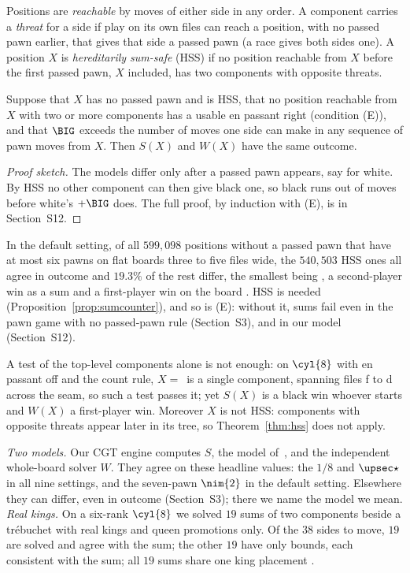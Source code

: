 \begin{definition}\label{def:hss}
Positions are \emph{reachable} by moves of either side in any order. A component carries a \emph{threat} for a
side if play on its own files can reach a position, with no passed pawn earlier, that gives that side a passed pawn (a race gives both sides one). A position $X$ is \emph{hereditarily
sum-safe} (HSS) if no position reachable from $X$ before the first passed pawn, $X$ included, has two components with opposite threats.
\end{definition}

\begin{theorem}\label{thm:hss}
Suppose that $X$ has no passed pawn and is HSS, that no position reachable from $X$ with two or more components has a usable en
passant right (condition (E)), and that $\BIG$ exceeds the number of moves one side can make in any sequence of pawn moves from $X$. Then $S(X)$ and
$W(X)$ have the same outcome.
\end{theorem}

\begin{proof}[Proof sketch]
The models differ only after a passed pawn appears, say for white. By HSS no other component can then give black
one, so black runs out of moves before white's $+\BIG$ does. The full proof, by induction with (E), is in
Section~S12.
\end{proof}

In the default setting, of all $599{,}098$ positions without a passed pawn that have at most six pawns on flat boards three to five
files wide, the $540{,}503$ HSS ones all agree in outcome and $19.3\%$ of the rest differ, the
smallest being , a second-player win as a sum and a first-player win on the board
. HSS is needed (Proposition~\ref{prop:sumcounter}), and so is
(E): without it, sums fail even in the pawn game with no passed-pawn rule  (Section~S3), and in our model  (Section~S12).

\begin{proposition}[\lab{C2}]\label{prop:sumcounter}
A test of the top-level components alone is not enough: on $\cyl{8}$ with en passant off and the count rule, $X=$\, is a single component, spanning files f to d across the seam, so such a test passes it; yet
$S(X)$ is a black win whoever starts and $W(X)$ a first-player win. Moreover $X$ is not HSS: components with
opposite threats appear later in its tree, so Theorem~\ref{thm:hss} does not apply.
\end{proposition}

\emph{Two models.} Our CGT engine computes $S$, the model of~\cite{Elkies1996}, and the independent
whole-board solver $W$. They agree on these headline values: the $1/8$ and $\upsec\star$ in all nine settings,
and the seven-pawn $\nim{2}$ in the default setting. Elsewhere they can differ, even in outcome (Section~S3);
there we name the model we mean.
\emph{Real kings.} On a six-rank $\cyl{8}$ we solved $19$ sums of two components beside a tr\'ebuchet with real
kings and queen promotions only. Of the $38$ sides to move, $19$ are solved and agree with the sum; the other
$19$ have only bounds, each consistent with the sum; all $19$ sums share one king placement .
